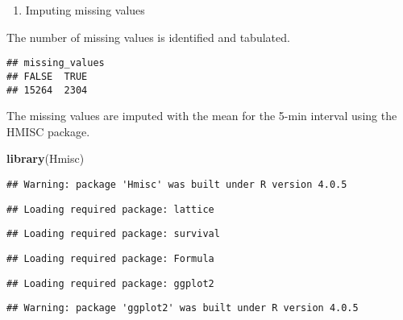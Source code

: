\documentclass[]{article}
\newenvironment{Shaded}{\begin{snugshade}}{\end{snugshade}}
\newcommand{\KeywordTok}[1]{\textcolor[rgb]{0.13,0.29,0.53}{\textbf{#1}}}
\newcommand{\StringTok}[1]{\textcolor[rgb]{0.31,0.60,0.02}{#1}}
\newcommand{\OperatorTok}[1]{\textcolor[rgb]{0.81,0.36,0.00}{\textbf{#1}}}
\newcommand{\NormalTok}[1]{#1}
\providecommand{\tightlist}{%
  \setlength{\itemsep}{0pt}\setlength{\parskip}{0pt}}
\begin{document}
\begin{enumerate}
\def\labelenumi{\arabic{enumi})}
\setcounter{enumi}{3}
\tightlist
\item
  Imputing missing values
\end{enumerate}

The number of missing values is identified and tabulated.

\begin{Shaded}
\end{Shaded}

\begin{verbatim}
## missing_values
## FALSE  TRUE 
## 15264  2304
\end{verbatim}

The missing values are imputed with the mean for the 5-min interval
using the HMISC package.

\begin{Shaded}
\begin{Highlighting}[]
\KeywordTok{library}\NormalTok{(Hmisc)}
\end{Highlighting}
\end{Shaded}

\begin{verbatim}
## Warning: package 'Hmisc' was built under R version 4.0.5
\end{verbatim}

\begin{verbatim}
## Loading required package: lattice
\end{verbatim}

\begin{verbatim}
## Loading required package: survival
\end{verbatim}

\begin{verbatim}
## Loading required package: Formula
\end{verbatim}

\begin{verbatim}
## Loading required package: ggplot2
\end{verbatim}

\begin{verbatim}
## Warning: package 'ggplot2' was built under R version 4.0.5
\end{verbatim}
\end{document}
